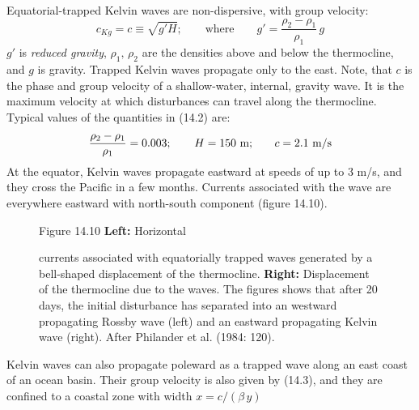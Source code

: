 Equatorial-trapped Kelvin waves are
non-dispersive, with group velocity:
\begin{equation}
c_{Kg} = c \equiv \sqrt{g'H}; \qquad \text{where} \qquad
g' = \frac{\rho_2 - \rho_1}{\rho_1}\,g
\end{equation}
$g'$ is \textit{reduced gravity},
$\rho_1, \, \rho_2$ are the densities above and below the
thermocline, and $g$ is gravity. Trapped
Kelvin waves propagate only to the east. Note, that $c$ is the phase
and group velocity of a shallow-water, internal, gravity wave. It is
the maximum velocity at which disturbances can travel along the
thermocline. Typical values of the quantities in (14.2) are:
\begin{equation}
\frac{\rho_2 - \rho_1}{\rho_1} = 0.003; \qquad H=150 \text{ m;} \qquad c =2.1
\text{ m/s} \notag
\end{equation}
At the equator, Kelvin waves propagate eastward at
speeds of up to 3 m/s, and they cross the Pacific in a few
months. Currents associated with the wave are everywhere eastward with
north-south component (figure 14.10).

\begin{figure}[t!]
\footnotesize
Figure 14.10 \textbf{Left:} Horizontal \rule{0pt}{4ex}currents
associated with equatorially trapped waves generated by a bell-shaped
displacement of the thermocline.
\textbf{Right:} Displacement of the
thermocline due to the waves. The
figures shows that after 20 days, the initial disturbance has
separated into an westward propagating Rossby wave
(left) and an eastward propagating Kelvin wave
(right). After Philander et al. (1984: 120).
\label{fig:rossbycurrents}
\vspace{-4ex}
\end{figure}

Kelvin waves can also propagate poleward as a trapped wave along an
east coast of an ocean basin. Their group velocity is also given by
(14.3), and they are confined to a coastal zone with width
$x=c/\left(\beta\,y\right)$

